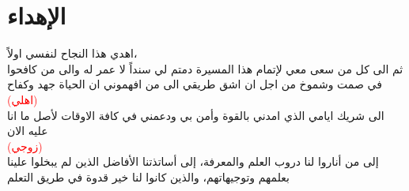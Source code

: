\chapter*{الإهداء}

\begin{center}
\begin{large}
	اهدي هذا النجاح لنفسي اولاً،\\[1cm]
ثم الى كل من سعى معي لإتمام هذا المسيرة دمتم لي سنداً لا عمر له والى من كافحوا  في صمت وشموخ  من اجل ان اشق طريقي الى من افهموني ان الحياة جهد وكفاح\\
\textcolor{red}{(اهلي)}\\[1cm]
الى شريك ايامي الذي امدني بالقوة وأمن بي ودعمني في كافة الاوقات لأصل ما انا عليه الان \\
\textcolor{red}{(زوجي)}\\[1cm]
إلى من أناروا لنا دروب العلم والمعرفة، إلى أساتذتنا الأفاضل الذين لم يبخلوا علينا بعلمهم وتوجيهاتهم، والذين كانوا لنا خير قدوة في طريق التعلم
\end{large}
\end{center}




